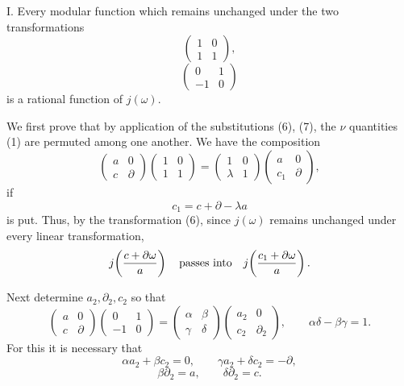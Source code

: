 \documentclass[11pt]{article}
\begin{document}
I. Every modular function which remains unchanged under the two transformations
\begin{equation}
\begin{pmatrix}1&0\\1&1\end{pmatrix},
\tag{6}
\end{equation}
\begin{equation}
\begin{pmatrix}0&1\\-1&0\end{pmatrix}
\tag{7}
\end{equation}
is a rational function of $j(\omega)$.

We first prove that by application of the substitutions (6), (7), the $\nu$ quantities (1) are permuted among one another. We have the composition
\begin{equation}
\begin{pmatrix}a&0\\c&\partial\end{pmatrix}
\begin{pmatrix}1&0\\1&1\end{pmatrix}
=
\begin{pmatrix}1&0\\\lambda&1\end{pmatrix}
\begin{pmatrix}a&0\\c_1&\partial\end{pmatrix},
\tag{8}
\end{equation}
if
\begin{equation}
c_1=c+\partial-\lambda a
\tag{9}
\end{equation}
is put. Thus, by the transformation (6), since $j(\omega)$ remains unchanged under every linear transformation,
\[
j\!\left({c+\partial\omega\over a}\right)
\quad\hbox{passes into}\quad
j\!\left({c_1+\partial\omega\over a}\right).
\]

Next determine $a_2,\partial_2,c_2$ so that
\begin{equation}
\begin{pmatrix}a&0\\c&\partial\end{pmatrix}
\begin{pmatrix}0&1\\-1&0\end{pmatrix}
=
\begin{pmatrix}\alpha&\beta\\\gamma&\delta\end{pmatrix}
\begin{pmatrix}a_2&0\\c_2&\partial_2\end{pmatrix},
\qquad
\alpha\delta-\beta\gamma=1.
\tag{10}
\end{equation}
For this it is necessary that
\begin{equation}
\alpha a_2+\beta c_2=0,
\qquad
\gamma a_2+\delta c_2=-\partial,
\tag{11}
\end{equation}
\begin{equation}
\beta\partial_2=a,
\qquad
\delta\partial_2=c.
\tag{12}
\end{equation}
\end{document}
